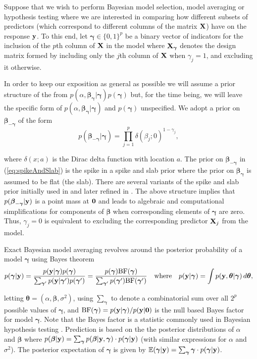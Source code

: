 \documentclass[12pt]{article}
\def\vectorfontone{\bf}
\def\vectorfonttwo{\boldsymbol}
\def\vy{{\vectorfontone y}}                      %
\def\vzero{{\vectorfontone 0}}
\def\vbeta{{\vectorfonttwo \beta}}               %
\def\vgamma{{\vectorfonttwo \gamma}}             %
\def\vtheta{{\vectorfonttwo \theta}}             %
\def\matrixfontone{\bf}
\def\mX{{\matrixfontone X}}                      %
\def\bE{{\mathbb E}}                             %
\def\ds{\displaystyle}
\begin{document}
Suppose that we wish to perform Bayesian model selection, model averaging or hypothesis 
testing where we are interested in comparing how different subsets of predictors 
(which correspond to different columns of the matrix $\mX$) have on the response $\vy$. To this end, 
let $\vgamma \in \{0, 1\}^p$ be a binary vector of indicators for the inclusion of the $p$th column 
of $\mX$ in the model where $\mX_\vgamma$ denotes the design matrix formed by including only the 
$j$th column of $\mX$ when $\gamma_j = 1$, and excluding it otherwise. 

In order to keep our exposition as general as possible we will assume a prior structure of
the from 
$p(\alpha,\vbeta_{\vgamma}|\vgamma)p(\vgamma)$ but,
for
the time being, we will leave the specific form of $p(\alpha,\vbeta_{\vgamma}|\vgamma)$ and $p(\vgamma)$ unspecified. 
We adopt a prior on $\vbeta_{-\vgamma}$  
of the form
\begin{equation}
\label{eq:spikeAndSlab}
\ds p(\vbeta_{-\vgamma}|\vgamma) = \prod_{j=1}^p \delta(\beta_j;0)^{1-\gamma_j},
\end{equation} 

\noindent where $\delta(x;a)$ is the Dirac delta function with location $a$.  
The prior on $\vbeta_{-\vgamma}$ in (\ref{eq:spikeAndSlab}) is the spike 
in a spike and slab prior where the prior on $\vbeta_{\vgamma}$ is assumed to be flat (the slab). There are
several variants of the spike and slab prior initially used in
\cite{Mitchell1988}
and later refined in
\cite{George1993}. 
The above structure implies 
that $p(\vbeta_{-\vgamma}|\vy)$ is a point mass at $\vzero$
and leads to
algebraic and computational simplifications for components of $\vbeta$ when corresponding elements of $\vgamma$ are zero.
Thus, $\gamma_j=0$ is equivalent to excluding the corresponding predictor $\mX_j$ from the model.


Exact Bayesian model averaging revolves around the posterior
 probability of a model $\vgamma$ using Bayes theorem
$$
\ds p(\vgamma|\vy) = \frac{p(\vy|\vgamma)p(\vgamma)}{\sum_{\vgamma'} p(\vy|\vgamma')p(\vgamma')} = \frac{p(\vgamma)\mbox{BF}(\vgamma)}{\sum_{\vgamma'} p(\vgamma')\mbox{BF}(\vgamma')}
\quad \mbox{where} \quad 
p(\vy|\vgamma) = \int p(\vy,\vtheta|\vgamma) \, d\vtheta,
$$

\noindent letting $\vtheta = (\alpha,\vbeta,\sigma^2)$, using $\sum_{\vgamma}$ to denote a combinatorial sum over all
$2^p$ possible values of $\vgamma$, and $\mbox{BF}(\vgamma) = p(\vy|\vgamma)/p(\vy|\vzero)$
is the null based Bayes factor for model $\vgamma$.
Note that the Bayes factor is a statistic commonly used in Bayesian hypothesis testing 
\citep{Kass1995,OrmerodEtal2017}.
Prediction is based on the 
the posterior distributions of $\alpha$ and $\vbeta$ where
$p(\vbeta|\vy) = \sum_{\vgamma} p(\vbeta|\vy,\vgamma) \cdot p(\vgamma|\vy)$
(with similar expressions for $\alpha$ and $\sigma^2$).
The 
posterior expectation of $\vgamma$ is given by
$\bE(\vgamma|\vy) = \sum_{\vgamma} \vgamma \cdot p(\vgamma|\vy)$.
\end{document}
